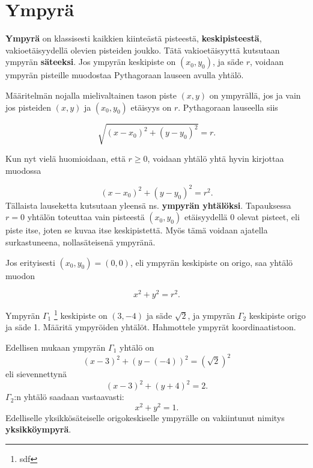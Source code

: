 \section{Ympyrä}


\textbf{Ympyrä} on klassisesti kaikkien kiinteästä pisteestä, \textbf{keskipisteestä}, vakioetäisyydellä olevien pisteiden joukko. Tätä vakioetäisyyttä kutsutaan ympyrän \textbf{säteeksi}. Jos ympyrän keskipiste on $(x_{0},y_{0})$, ja säde $r$, voidaan ympyrän pisteille muodostaa Pythagoraan lauseen avulla yhtälö.

Määritelmän nojalla mielivaltainen tason piste $(x,y)$ on ympyrällä, jos ja vain jos pisteiden $(x,y)$ ja $(x_{0},y_{0})$ etäisyys on $r$. Pythagoraan lauseella siis

\[
\sqrt{(x-x_{0})^{2}+(y-y_{0})^{2}} = r.
\]

Kun nyt vielä huomioidaan, että $r \geq 0$, voidaan yhtälö yhtä hyvin kirjottaa muodossa

\[
(x-x_{0})^{2}+(y-y_{0})^{2} = r^{2}.
\]
Tällaista lauseketta kutsutaan yleensä ns. \textbf{ympyrän yhtälöksi}. Tapauksessa $r=0$ yhtälön toteuttaa vain pisteestä $(x_{0},y_{0})$ etäisyydellä 0 olevat pisteet, eli piste itse, joten se kuvaa itse keskipistettä. Myös tämä voidaan ajatella surkastuneena, nollasäteisenä ympyränä.

Jos erityisesti $(x_{0},y_{0})= (0,0)$, eli ympyrän keskipiste on origo, saa yhtälö muodon

\[
x^{2}+y^{2} = r^{2}.
\]

\begin{esimerkki}
Ympyrän $\Gamma_{1}$ \footnote{sdf} keskipiste on $(3,-4)$ ja säde $\sqrt{2}$, ja ympyrän $\Gamma_{2}$ keskipiste origo ja säde 1. Määritä ympyröiden yhtälöt. Hahmottele ympyrät koordinaatistoon.

\begin{esimratk}
Edellisen mukaan ympyrän $\Gamma_{1}$ yhtälö on
\[
(x-3)^{2}+(y-(-4))^{2} = (\sqrt{2})^{2}
\]
eli sievennettynä
\[
(x-3)^{2}+(y+4)^{2} = 2.
\]
$\Gamma_{2}$:n yhtälö saadaan vastaavasti:
\[
x^{2}+y^{2} = 1.
\]
Edelliselle yksikkösäteiselle origokeskiselle ympyrälle on vakiintunut nimitys \textbf{yksikköympyrä}.
\end{esimratk}
\end{esimerkki}





